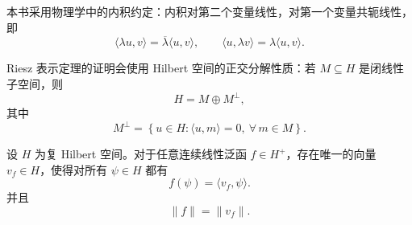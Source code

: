 \documentclass[UTF8,a4paper,11pt,openany]{ctexbook}
\begin{document}
本书采用物理学中的内积约定：内积对第二个变量线性，对第一个变量共轭线性，即
\[
\langle \lambda u,v\rangle
=
\overline{\lambda}\langle u,v\rangle,
\qquad
\langle u,\lambda v\rangle
=
\lambda\langle u,v\rangle.
\]

Riesz 表示定理的证明会使用 Hilbert 空间的正交分解性质：若 $M\subseteq H$ 是闭线性子空间，则
\begin{equation}
    H=M\oplus M^\perp,
\end{equation}
其中
\[
M^\perp
=
\left\{
u\in H:
\langle u,m\rangle=0,\ 
\forall\,m\in M
\right\}.
\]

\begin{proposition}
设 $H$ 为复 Hilbert 空间。对于任意连续线性泛函 $f\in H^+$，存在唯一的向量 $v_f\in H$，使得对所有 $\psi\in H$ 都有
\begin{equation}
    f(\psi)
    =
    \langle v_f,\psi\rangle.
\end{equation}
并且
\begin{equation}
    \|f\|
    =
    \|v_f\|.
\end{equation}
\end{proposition}
\end{document}
